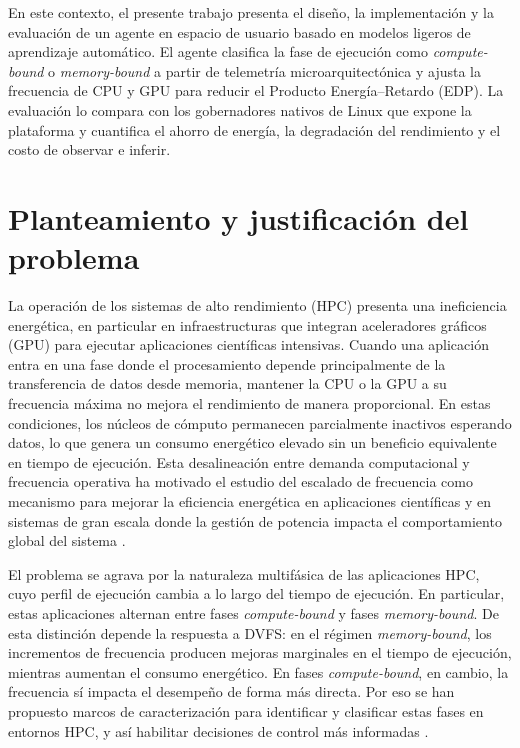 En este contexto, el presente trabajo presenta el diseño, la implementación y la evaluación de un agente en espacio de usuario basado en modelos ligeros de aprendizaje automático. El agente clasifica la fase de ejecución como \textit{compute-bound} o \textit{memory-bound} a partir de telemetría microarquitectónica y ajusta la frecuencia de CPU y GPU para reducir el Producto Energía--Retardo (EDP). La evaluación lo compara con los gobernadores nativos de Linux que expone la plataforma y cuantifica el ahorro de energía, la degradación del rendimiento y el costo de observar e inferir.


\section*{Planteamiento y justificación del problema}

La operación de los sistemas de alto rendimiento (HPC) presenta una ineficiencia energética, en particular en infraestructuras que integran aceleradores gráficos (GPU) para ejecutar aplicaciones científicas intensivas. Cuando una aplicación entra en una fase donde el procesamiento depende principalmente de la transferencia de datos desde memoria, mantener la CPU o la GPU a su frecuencia máxima no mejora el rendimiento de manera proporcional. En estas condiciones, los núcleos de cómputo permanecen parcialmente inactivos esperando datos, lo que genera un consumo energético elevado sin un beneficio equivalente en tiempo de ejecución. Esta desalineación entre demanda computacional y frecuencia operativa ha motivado el estudio del escalado de frecuencia como mecanismo para mejorar la eficiencia energética en aplicaciones científicas \cite{Simsek2024} y en sistemas de gran escala donde la gestión de potencia impacta el comportamiento global del sistema \cite{Costa2025}.

El problema se agrava por la naturaleza multifásica de las aplicaciones HPC, cuyo perfil de ejecución cambia a lo largo del tiempo de ejecución. En particular, estas aplicaciones alternan entre fases \textit{compute-bound} y fases \textit{memory-bound}. De esta distinción depende la respuesta a DVFS: en el régimen \textit{memory-bound}, los incrementos de frecuencia producen mejoras marginales en el tiempo de ejecución, mientras aumentan el consumo energético. En fases \textit{compute-bound}, en cambio, la frecuencia sí impacta el desempeño de forma más directa. Por eso se han propuesto marcos de caracterización para identificar y clasificar estas fases en entornos HPC, y así habilitar decisiones de control más informadas \cite{Antici2024,Calore2017}.

